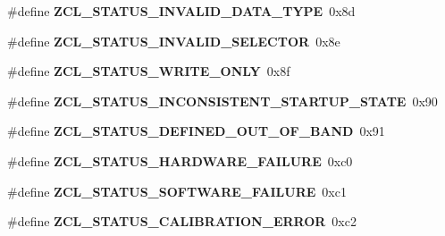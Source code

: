 \begin{DoxyCompactItemize}
\item 
\hypertarget{group__zcl_ga59b0c5ada36435dc36af717573f91b16}{\#define {\bfseries Z\-C\-L\-\_\-\-S\-T\-A\-T\-U\-S\-\_\-\-I\-N\-V\-A\-L\-I\-D\-\_\-\-D\-A\-T\-A\-\_\-\-T\-Y\-P\-E}~0x8d}\label{group__zcl_ga59b0c5ada36435dc36af717573f91b16}

\item 
\hypertarget{group__zcl_ga28907da0ee4264d19ff6c2c354b7c50b}{\#define {\bfseries Z\-C\-L\-\_\-\-S\-T\-A\-T\-U\-S\-\_\-\-I\-N\-V\-A\-L\-I\-D\-\_\-\-S\-E\-L\-E\-C\-T\-O\-R}~0x8e}\label{group__zcl_ga28907da0ee4264d19ff6c2c354b7c50b}

\item 
\hypertarget{group__zcl_gac7386b6a4777fb92dbbf86a5b014807d}{\#define {\bfseries Z\-C\-L\-\_\-\-S\-T\-A\-T\-U\-S\-\_\-\-W\-R\-I\-T\-E\-\_\-\-O\-N\-L\-Y}~0x8f}\label{group__zcl_gac7386b6a4777fb92dbbf86a5b014807d}

\item 
\hypertarget{group__zcl_gaee6e14129b1399a33c1a29dc7b912396}{\#define {\bfseries Z\-C\-L\-\_\-\-S\-T\-A\-T\-U\-S\-\_\-\-I\-N\-C\-O\-N\-S\-I\-S\-T\-E\-N\-T\-\_\-\-S\-T\-A\-R\-T\-U\-P\-\_\-\-S\-T\-A\-T\-E}~0x90}\label{group__zcl_gaee6e14129b1399a33c1a29dc7b912396}

\item 
\hypertarget{group__zcl_ga1361f5efe6f70e39fbb7c91174d94076}{\#define {\bfseries Z\-C\-L\-\_\-\-S\-T\-A\-T\-U\-S\-\_\-\-D\-E\-F\-I\-N\-E\-D\-\_\-\-O\-U\-T\-\_\-\-O\-F\-\_\-\-B\-A\-N\-D}~0x91}\label{group__zcl_ga1361f5efe6f70e39fbb7c91174d94076}

\item 
\hypertarget{group__zcl_ga34e6f4bfd5b2539f9644fcbd1449724f}{\#define {\bfseries Z\-C\-L\-\_\-\-S\-T\-A\-T\-U\-S\-\_\-\-H\-A\-R\-D\-W\-A\-R\-E\-\_\-\-F\-A\-I\-L\-U\-R\-E}~0xc0}\label{group__zcl_ga34e6f4bfd5b2539f9644fcbd1449724f}

\item 
\hypertarget{group__zcl_ga0a3806ae2bf91be66123013afd4ccdec}{\#define {\bfseries Z\-C\-L\-\_\-\-S\-T\-A\-T\-U\-S\-\_\-\-S\-O\-F\-T\-W\-A\-R\-E\-\_\-\-F\-A\-I\-L\-U\-R\-E}~0xc1}\label{group__zcl_ga0a3806ae2bf91be66123013afd4ccdec}

\item 
\hypertarget{group__zcl_ga64a57931e9c19abbd33a2edb4acefb8c}{\#define {\bfseries Z\-C\-L\-\_\-\-S\-T\-A\-T\-U\-S\-\_\-\-C\-A\-L\-I\-B\-R\-A\-T\-I\-O\-N\-\_\-\-E\-R\-R\-O\-R}~0xc2}\label{group__zcl_ga64a57931e9c19abbd33a2edb4acefb8c}

\end{DoxyCompactItemize}
